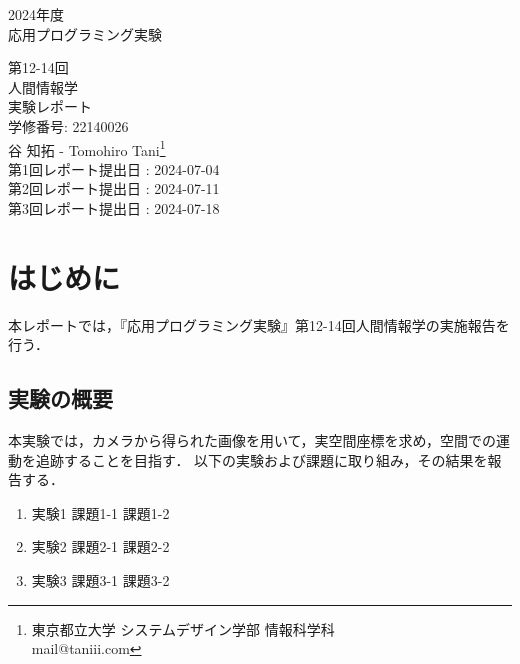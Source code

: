 \documentclass[fleqn, a4paper. 12pt]{jsarticle}
\begin{document}
  \begin{titlepage}
    \begin{center}
      {\Huge 2024年度\\応用プログラミング実験}
      
      \vspace{4cm}
      {\Huge 第12-14回\\人間情報学\\
        実験レポート\\
      }
      \vspace{4cm}
      {\large 学修番号: 22140026\\谷 知拓 - Tomohiro Tani\footnote{東京都立大学 システムデザイン学部 情報科学科 \\ mail@taniii.com} \\}
      \vspace{0.5cm}
      {\large
        第1回レポート提出日 : 2024-07-04 \\
        第2回レポート提出日 : 2024-07-11 \\
        第3回レポート提出日 : 2024-07-18 \\
      }
    \end{center}
  \end{titlepage}

  \section*{はじめに}

    本レポートでは，『応用プログラミング実験』第12-14回人間情報学の実施報告を行う．

  \subsection*{実験の概要}

    本実験では，カメラから得られた画像を用いて，実空間座標を求め，空間での運動を追跡することを目指す．
    以下の実験および課題に取り組み，その結果を報告する．

    \begin{enumerate}
      \item 実験1
        \subitem 課題1-1
        \subitem 課題1-2
      \item 実験2
        \subitem 課題2-1
        \subitem 課題2-2
      \item 実験3
        \subitem 課題3-1
        \subitem 課題3-2
      
    \end{enumerate}
\end{document}
